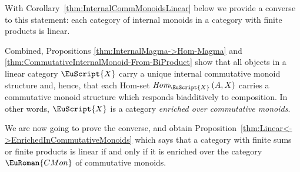 \documentclass [12pt,oneside]{book}%
\theoremstyle{captionstyle}  %
\newcommand{\HomIn}[3]{\textit{Hom}_{#1}\left(#2,#3\right)}
\newcommand{\CMon}{\ensuremath{\EuRoman{CMon}}}
\newcommand{\Ctgry}[1]{\EuScript{#1}}					%
\begin{document}
With Corollary~\ref{thm:InternalCommMonoidsLinear} below we provide a converse to this statement: each category of internal monoids in a category with finite products is linear.


Combined, Propositions \ref{thm:InternalMagma->Hom-Magma} and \ref{thm:CommutativeInternalMonoid-From-BiProduct} show that all objects in a linear category $\Ctgry{X} $ carry a unique internal commutative monoid structure and, hence, that each Hom-set $\HomIn{\Ctgry{X} }{A}{X}$ carries a commutative monoid structure which responds biadditively to composition. In other words, $\Ctgry{X}$ is a category \emph{enriched over commutative monoids}.

We are now going to prove the converse, and obtain Proposition~\ref{thm:Linear<->EnrichedInCommutativeMonoids} which says that a category with finite sums or finite products is linear if and only if it is enriched over the category $\CMon$ of commutative monoids.
\end{document}
